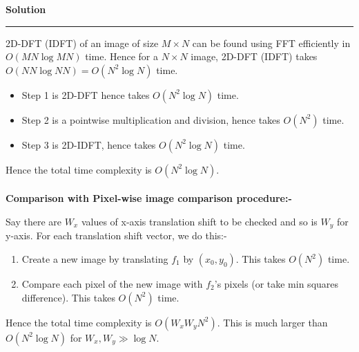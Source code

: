 \documentclass[a4paper,12pt]{article}
\newenvironment{solution}[2][]{%
\begin{mdframed}[linecolor=blue!70!black, linewidth=2pt, roundcorner=10pt, backgroundcolor=yellow!10!white, skipabove=12pt, skipbelow=12pt]%
	\textbf{\large #2}
	\par\noindent\rule{\textwidth}{0.4pt}
}{
\end{mdframed}
}
\begin{document}
\begin{solution}{Solution}
2D-DFT (IDFT) of an image of size $M \times N$ can be found using FFT efficiently in $O(MN \log MN)$ time. Hence for a $N \times N$ image, 2D-DFT (IDFT) takes $O(NN \log NN) = O(N^2 \log N)$ time.
\begin{itemize}
	\item Step 1 is 2D-DFT hence takes $O(N^2 \log N)$ time.
	\item Step 2 is a pointwise multiplication and division, hence takes $O(N^2)$ time.
	\item Step 3 is 2D-IDFT, hence takes $O(N^2 \log N)$ time.
\end{itemize}
Hence the total time complexity is $O(N^2 \log N)$. \\ \\
\textbf{\Large Comparison with Pixel-wise image comparison procedure:-}

Say there are $W_x$ values of x-axis translation shift to be checked and so is $W_y$ for y-axis. For each translation shift vector, we do this:-
\begin{enumerate}
	\item Create a new image by translating $f_1$ by $(x_0, y_0)$. This takes $O(N^2)$ time.
	\item Compare each pixel of the new image with $f_2$'s pixels (or take min squares difference). This takes $O(N^2)$ time.
\end{enumerate}
Hence the total time complexity is $O(W_x W_y N^2)$. This is much larger than $O(N^2 \log N)$ for $W_x, W_y \gg \log N$.
\end{solution}
\end{document}
